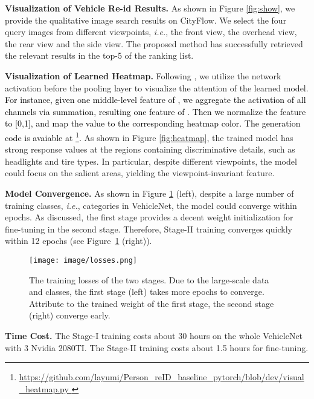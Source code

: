 \documentclass[journal]{IEEEtran}
\def\ie{\emph{i.e.}}
\newcommand{\zznote}[1]{\textcolor{black}{#1}}
\begin{document}
\noindent \textbf{Visualization of Vehicle Re-id Results.} As shown in Figure \ref{fig:show}, we provide the qualitative image search results on CityFlow. We select the four query images from different viewpoints, \ie, the front view, the overhead view, the rear view and the side view. The proposed method has successfully retrieved the relevant results in the top-5 of the ranking list. 

\noindent \textbf{Visualization of Learned Heatmap.} Following \cite{zheng2016discriminatively,bai2018group}, we utilize the network activation before the pooling layer to visualize the attention of the learned model. \zznote{For instance, given one middle-level feature of , we aggregate the activation of all channels via summation, resulting one feature of . Then we normalize the feature to [0,1], and map the value to the corresponding heatmap color. The generation code is avaiable at \footnote{\tiny\url{https://github.com/layumi/Person_reID_baseline_pytorch/blob/dev/visual_heatmap.py  }}. }As shown in Figure \ref{fig:heatmap}, the trained model has strong response values at the regions containing discriminative details, such as headlights and tire types. In particular, despite different viewpoints, the model could focus on the salient areas, yielding the viewpoint-invariant feature.

\noindent \textbf{Model Convergence.} As shown in Figure \ref{fig:loss} (left), despite a large number of training classes, \ie,  categories in VehicleNet, the model could converge within  epochs. As discussed, the first stage provides a decent weight initialization for fine-tuning in the second stage. Therefore, Stage-II training converges quickly within 12 epochs (see Figure~\ref{fig:loss} (right)). 

\begin{figure}[t]
\begin{center}
\texttt{[image: image/losses.png]}
\end{center}
\vspace{-.2in}
   \caption{The training losses of the two stages. Due to the large-scale data and classes, the first stage (left) takes more epochs to converge. Attribute to the trained weight of the first stage, the second stage (right) converge early.}
\label{fig:loss}
\vspace{-.1in}
\end{figure}

\noindent \textbf{Time Cost.} The Stage-I training costs about 30 hours on the whole VehicleNet with 3  Nvidia 2080TI. The Stage-II training costs about 1.5 hours for fine-tuning.
\end{document}

